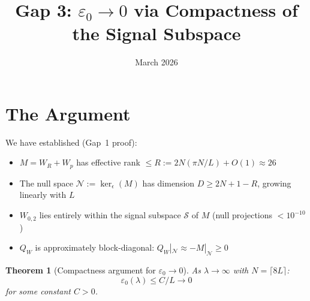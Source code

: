 \documentclass[11pt]{article}
\title{Gap 3: $\varepsilon_0 \to 0$ via Compactness of the Signal Subspace}
\date{March 2026}
\newtheorem{theorem}{Theorem}
\begin{document}
\maketitle

\section{The Argument}

We have established (Gap~1 proof):
\begin{itemize}
\item $M = W_R + W_p$ has effective rank $\leq R := 2N(\pi N/L) + O(1) \approx 26$
\item The null space $\mathcal{N} := \ker_\epsilon(M)$ has dimension $D \geq 2N + 1 - R$, growing linearly with $L$
\item $W_{0,2}$ lies entirely within the signal subspace $\mathcal{S}$ of $M$ (null projections $< 10^{-10}$)
\item $Q_W$ is approximately block-diagonal: $Q_W|_\mathcal{N} \approx -M|_\mathcal{N} \geq 0$
\end{itemize}

\begin{theorem}[Compactness argument for $\varepsilon_0 \to 0$]\label{thm:eps0}
As $\lambda \to \infty$ with $N = \lceil 8L \rceil$:
\[
\varepsilon_0(\lambda) \leq C / L \to 0
\]
for some constant $C > 0$.
\end{theorem}
\end{document}
